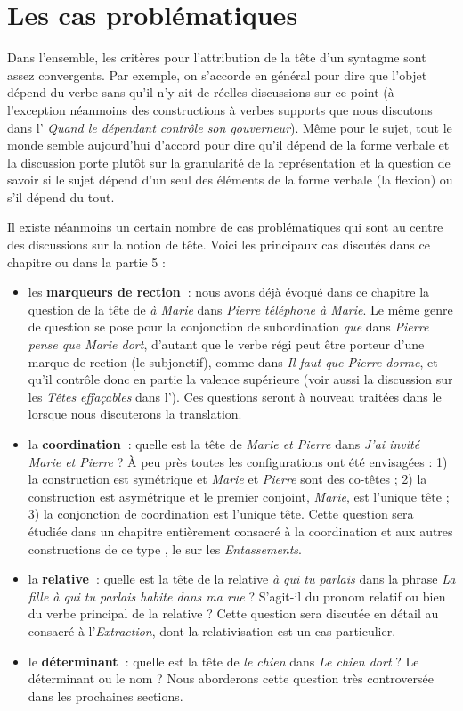 \section{Les cas problématiques}\label{sec:3.3.21}

Dans l’ensemble, les critères pour l’attribution de la tête d’un syntagme sont assez convergents. Par exemple, on s’accorde en général pour dire que l’objet dépend du verbe sans qu’il n’y ait de réelles discussions sur ce point (à l’exception néanmoins des constructions à verbes supports que nous discutons dans l’ \textit{Quand le dépendant contrôle son gouverneur}). Même pour le sujet, tout le monde semble aujourd’hui d’accord pour dire qu’il dépend de la forme verbale et la discussion porte plutôt sur la granularité de la représentation et la question de savoir si le sujet dépend d’un seul des éléments de la forme verbale (la flexion) ou s’il dépend du tout.

Il existe néanmoins un certain nombre de cas problématiques qui sont au centre des discussions sur la notion de tête. Voici les principaux cas discutés dans ce chapitre ou dans la partie 5 :

\begin{itemize}
\item les \textbf{marqueurs de rection~}: nous avons déjà évoqué dans ce chapitre la question de la tête de \textit{à Marie} dans \textit{Pierre téléphone à Marie}. Le même genre de question se pose pour la conjonction de subordination \textit{que} dans \textit{Pierre pense que Marie dort}, d’autant que le verbe régi peut être porteur d’une marque de rection (le subjonctif), comme dans \textit{Il faut que Pierre dorme}, et qu’il contrôle donc en partie la valence supérieure (voir aussi la discussion sur les \textit{Têtes effaçables} dans l’). Ces questions seront à nouveau traitées dans le  lorsque nous discuterons la translation.
\item la \textbf{coordination~}: quelle est la tête de \textit{Marie et Pierre} dans \textit{J’ai invité Marie et Pierre} ? À peu près toutes les configurations ont été envisagées : 1) la construction est symétrique et \textit{Marie} et \textit{Pierre} sont des co-têtes ; 2) la construction est asymétrique et le premier conjoint, \textit{Marie}, est l’unique tête ; 3) la conjonction de coordination est l’unique tête. Cette question sera étudiée dans un chapitre entièrement consacré à la coordination et aux autres constructions de ce type , le  sur les \textit{Entassements}.
\item la \textbf{relative~}: quelle est la tête de la relative \textit{à qui tu parlais} dans la phrase \textit{La fille à qui tu parlais habite dans ma rue} ? S’agit-il du pronom relatif ou bien du verbe principal de la relative ? Cette question sera discutée en détail au  consacré à l’\textit{Extraction}, dont la relativisation est un cas particulier.
\item le \textbf{déterminant~}: quelle est la tête de \textit{le chien} dans \textit{Le chien dort} ? Le déterminant ou le nom ? Nous aborderons cette question très controversée dans les prochaines sections.
\end{itemize}

